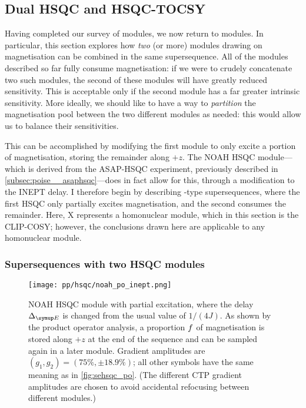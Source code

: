 \subsection{Dual HSQC and HSQC-TOCSY}
\label{subsec:noah__hsqctocsy}

Having completed our survey of \nitrogen{} modules, we now return to \carbon{} modules.
In particular, this section explores how \textit{two} (or more) modules drawing on  magnetisation can be combined in the same supersequence.
All of the \carbon{} modules described so far fully consume  magnetisation: if we were to crudely concatenate two such modules, the second of these modules will have greatly reduced sensitivity.
This is acceptable only if the second module has a far greater intrinsic sensitivity.
More ideally, we should like to have a way to \textit{partition} the magnetisation pool between the two different modules as needed: this would allow us to balance their sensitivities.

This can be accomplished by modifying the first module to only excite a portion of  magnetisation, storing the remainder along $+z$.
The NOAH HSQC module---which is derived from the ASAP-HSQC experiment\autocite{SchulzeSunninghausen2014JACS,SchulzeSunninghausen2017JMR}, previously described in \cref{subsec:poise__asaphsqc}---does in fact allow for this, through a modification to the INEPT delay.
I therefore begin by describing -type supersequences, where the first HSQC only partially excites  magnetisation, and the second consumes the remainder.
Here, X represents a homonuclear module, which in this section is the CLIP-COSY; however, the conclusions drawn here are applicable to any homonuclear module.


\subsubsection{Supersequences with two HSQC modules}

\begin{figure}[!ht]
    \centering
    \texttt{[image: pp/hsqc/noah\_po\_inept.png]}%
    \caption[NOAH HSQC module with partial excitation product operator analysis]{
        NOAH HSQC module with partial excitation, where the delay $\DeltaE$ is changed from the usual value of $1 / (4J)$.
        As shown by the product operator analysis, a proportion $f\/$ of  magnetisation is stored along $+z$ at the end of the sequence and can be sampled again in a later module.
        Gradient amplitudes are $(g_1, g_2) = (75\%, \pm 18.9\%)$; all other symbols have the same meaning as in \cref{fig:sehsqc_po}.
        (The different CTP gradient amplitudes are chosen to avoid accidental refocusing between different modules.)
    }
    \label{fig:noah_hsqc_deltae_po}
\end{figure}

